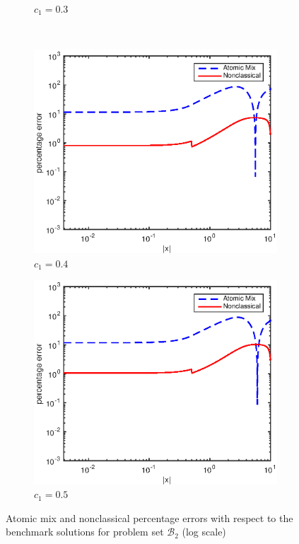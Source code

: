 \documentclass[12pt]{article}
\newcommand{\setb}{\mathcal{B}}
\begin{document}
{\begin{figure}[p]
\begin{subfigure}{0.495\textwidth}
        \caption{$c_1 = 0.3$}
        \label{figerrE30}
    \end{subfigure}
    \\
    \centering
    \begin{subfigure}{0.495\textwidth}
        \centering
        \includegraphics[width=\textwidth]{NSE_err_E40.eps}
        \caption{$c_1 = 0.4$}
        \label{figerrE40}
    \end{subfigure}
    \hfill
    \begin{subfigure}{0.495\textwidth}
        \centering
        \includegraphics[width=\textwidth]{NSE_err_E50.eps}
        \caption{$c_1 = 0.5$}
        \label{figerrE50}
    \end{subfigure}
    \caption{Atomic mix and nonclassical percentage errors with respect to the benchmark solutions for problem set $\setb_2$ (log scale)}
    \label{figerrE1}
\end{figure}





}
\end{document}
